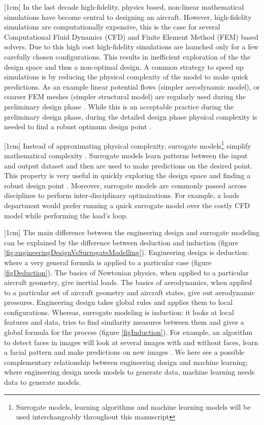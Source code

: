 [1cm]
In the last decade high-fidelity, physics based, non-linear mathematical simulations have become central to designing an aircraft. However, high-fidelity simulations are computationally expensive, this is the case for several Computational Fluid Dynamics (CFD) and Finite Element Method (FEM) based solvers. Due to this high cost high-fidelity simulations are launched only for a few carefully chosen configurations. This results in inefficient exploration of the the design space and thus a non-optimal design. A common strategy to speed up simulations is by reducing the physical complexity of the model to make quick predictions. As an example linear potential flows (simpler aerodynamic model), or coarser FEM meshes (simpler structural model) are regularly used during the preliminary design phase \cite{cummings2015applied}. While this is an acceptable practice during the preliminary design phase, during the detailed design phase physical complexity is needed to find a robust optimum design point \cite{raymer2012aircraft}.

[1cm]
Instead of approximating physical complexity, surrogate models\footnote{Surrogate models, learning algorithms and machine learning models will be used interchangeably throughout this manuscript} simplify mathematical complexity \cite{verveld2016reduced}. Surrogate models learn patterns between the input and output dataset and then are used to make predictions on the desired point. This property is very useful in quickly exploring the design space and finding a robust design point \cite{forrester2008engineering}. Moreover, surrogate models are commonly passed across disciplines to perform inter-disciplinary optimizations. For example, a loads department would prefer running a quick surrogate model over the costly CFD model while performing the load's loop.  

[1cm]
The main difference between the engineering design and surrogate modeling can be explained by the difference between deduction and induction \cite{domingos2012few} (figure \ref{fig:engineeringDesignVsSurrogateModelling}). Engineering design is deduction: where a very general formula is applied to a particular case (figure \ref{figDeduction}). The basics of Newtonian physics, when applied to a particular aircraft geometry, give inertial loads. The basics of aerodynamics, when applied to a particular set of aircraft geometry and aircraft states, give out aerodynamic pressures. Engineering design takes global rules and applies them to local configurations. Whereas, surrogate modeling is induction: it looks at local features and data, tries to find similarity measures between them and gives a global formula for the process (figure \ref{figInduction}). For example, an algorithm to detect faces in images will look at several images with and without faces, learn a facial pattern and make predictions on new images \cite{marszalek2007semantic}. We here see a possible complementary relationship between engineering design and machine learning; where engineering design needs models to generate data, machine learning needs data to generate models.

